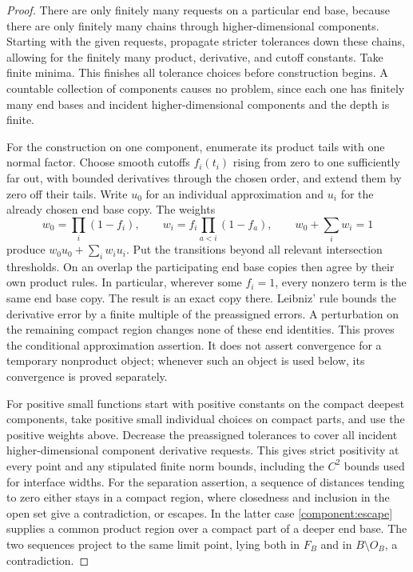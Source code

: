 \begin{proof}
There are only finitely many requests on a particular end base, because
there are only finitely many chains through higher-dimensional components.  Starting with the given
requests, propagate stricter tolerances down these chains, allowing
for the finitely many product, derivative, and cutoff constants.
Take finite minima.  This finishes all tolerance choices before construction
begins.  A countable collection of components causes no problem, since
each one has finitely many end bases and incident higher-dimensional components and the depth is finite.

For the construction on one component, enumerate its product tails with one normal factor.
Choose smooth cutoffs $f_i(t_i)$ rising from zero to one sufficiently
far out, with bounded derivatives through the chosen order, and
extend them by zero off their tails.  Write $u_0$ for an individual
approximation and $u_i$ for the already chosen end base copy.  The weights
\begin{equation}\label{component:blend}
 w_0=\prod_i(1-f_i),\qquad
 w_i=f_i\prod_{a<i}(1-f_a),\qquad
 w_0+\sum_iw_i=1
\end{equation}
produce $w_0u_0+\sum_iw_iu_i$.  Put the transitions beyond all relevant
intersection thresholds.  On an overlap the participating end base copies
then agree by their own product rules.  In particular, wherever some
$f_i=1$, every nonzero term is the same end base copy.  The result is an
exact copy there.  Leibniz' rule bounds the derivative error by a finite
multiple of the preassigned errors.  A perturbation on the remaining
compact region changes none of these end identities.
This proves the conditional approximation assertion.  It does not
assert convergence for a temporary nonproduct object; whenever such
an object is used below, its convergence is proved separately.

For positive small functions start with positive constants on the
compact deepest components, take positive small individual choices on
compact parts, and use the positive weights above.  Decrease the
preassigned tolerances to cover all incident higher-dimensional component derivative requests.
This gives strict positivity at every point and any stipulated finite
norm bounds, including the $C^2$ bounds used for interface widths.
For the separation assertion, a sequence of distances tending to
zero either stays in a compact region, where closedness and inclusion
in the open set give a contradiction, or escapes.  In the latter case
\cref{component:escape} supplies a common product region over a compact
part of a deeper end base.  The two sequences project to the same limit
point, lying both in $F_B$ and in $B\setminus O_B$, a contradiction.
\end{proof}

